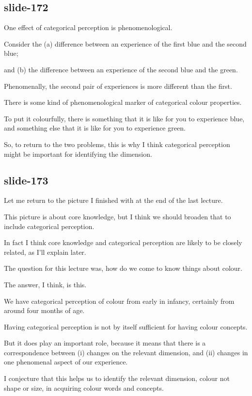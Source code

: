 \documentclass[12pt,\papersize]{extarticle}
\begin{document}
\subsection{slide-172}
One effect of categorical perception is phenomenological.
 
Consider the (a) difference between an experience of the first blue and the second blue;
 
and (b) the difference between an experience of the second blue and the green.
 
Phenomenally, the second pair of experiences is more different than the first.
 
There is some kind of phenomenological marker of categorical colour properties.
 
To put it colourfully, there is something that it is like for you to experience blue, and something else that it is like for you to experience green.
 
So, to return to the two problems, this is why I think categorical perception might be important for identifying the dimension.
 
\subsection{slide-173}
Let me return to the picture I finished with at the end of the last lecture.
 
This picture is about core knowledge, but I think we should broaden that to include categorical perception.
 
In fact I think core knowledge and categorical perception are likely to be closely related, as I'll explain later.
 
 
 
The question for this lecture was, how do we come to know things about colour.
 
The answer, I think, is this.
 
We have categorical perception of colour from early in infancy, certainly from around four months of age.
 
Having categorical perception is not by itself sufficient for having colour concepts.
 
But it does play an important role, because it means that there is a correspondence between (i) changes on the relevant dimension, and (ii) changes in one phenomenal aspect of our experience.
 
I conjecture that this helps us to identify the relevant dimension, colour not shape or size, in acquiring colour words and concepts.
 
\end{document}

